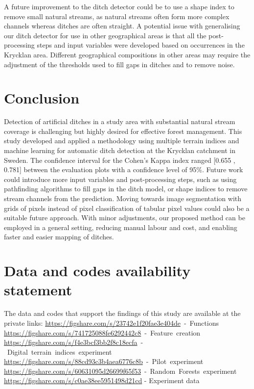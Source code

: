 \documentclass[]{interact}
\theoremstyle{plain}%
\theoremstyle{definition}
\theoremstyle{remark}
\begin{document}
A future improvement to the ditch detector could be to use a shape index to remove small natural streams, as natural streams often form more complex channels whereas ditches are often straight. A potential issue with generalising our ditch detector for use in other geographical areas is that all the post-processing steps and input variables were developed based on occurrences in the Krycklan area. Different geographical compositions in other areas may require the adjustment of the thresholds used to fill gaps in ditches and to remove noise.

\section{Conclusion}

Detection of artificial ditches in a study area with substantial natural stream coverage is
challenging but highly desired for effective forest management. This study developed and applied a methodology using multiple terrain indices and machine learning for automatic ditch detection at the Krycklan catchment in Sweden. The confidence interval for the Cohen's Kappa index ranged [0.655 , 0.781] between the evaluation plots with a confidence level of 95\%. Future work could introduce more input variables and post-processing steps, such as using pathfinding algorithms to fill gaps in the ditch model, or shape indices to remove stream channels from the prediction. Moving towards image segmentation with grids of pixels instead of pixel classification of tabular pixel values could also be a suitable future approach. With minor adjustments, our proposed method can be employed in a general setting, reducing manual labour and cost, and enabling faster and easier mapping of ditches.

\section*{Data and codes availability statement}
The data and codes that support the findings of this study are available at the private links:\newline
\mbox{\href{https://figshare.com/s/23742e1f20fae3e404de}{https://figshare.com/s/23742e1f20fae3e404de} - Functions\itshape\ignorespaces}
\mbox{\href{https://figshare.com/s/741725088fe6292442c8}{https://figshare.com/s/741725088fe6292442c8} - Feature creation\itshape\ignorespaces}
\mbox{\href{https://figshare.com/s/f4e3bcf3bb2f8c18ecfa}{https://figshare.com/s/f4e3bcf3bb2f8c18ecfa} - Digital terrain indices experiment\itshape\ignorespaces}
\mbox{\href{https://figshare.com/s/88cd93c3b4aea6776c8b}{https://figshare.com/s/88cd93c3b4aea6776c8b} - Pilot experiment\itshape\ignorespaces}
\mbox{\href{https://figshare.com/s/60631095d26699f65f53}{https://figshare.com/s/60631095d26699f65f53} - Random Forests experiment\itshape\ignorespaces}
\mbox{\href{https://figshare.com/s/c0ae38ee5951498d21cd}{https://figshare.com/s/c0ae38ee5951498d21cd}} - Experiment data
\end{document}
